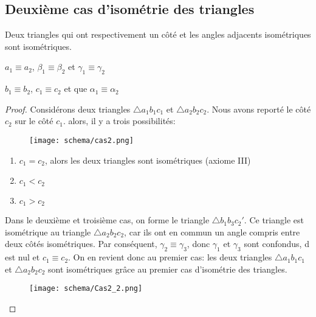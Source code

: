 \documentclass[a4paper,12pt]{article}
\begin{document}
\pagebreak
\subsection{Deuxième cas d'isométrie des triangles}
\begin{theorem}
Deux triangles qui ont respectivement un côté et les angles adjacents isométriques sont isométriques.
\end{theorem}
\begin{hyp}
$a_1 \equiv a_2$, $\beta_1 \equiv \beta_2$ et $\gamma_1 \equiv \gamma_2$
\end{hyp}
\begin{concl}
$b_1 \equiv b_2$, $c_1 \equiv c_2$ et que $\alpha_1 \equiv \alpha_2$
\end{concl}
\begin{proof}
Considérons deux triangles $\triangle a_1b_1c_1$ et $\triangle a_2b_2c_2$. Nous avons reporté le côté $c_2$ sur le côté $c_1$. alors, il y a trois possibilités:
\begin{figure}[H]
    \centering
    \texttt{[image: schema/cas2.png]}
\end{figure}
\begin{enumerate}
\item $c_1 = c_2$, alors les deux triangles sont isométriques (axiome III)
\item $c_1<c_2$
\item $c_1>c_2$
\end{enumerate}

\pagebreak
Dans le deuxième et troisième cas, on forme le triangle $\triangle b_1b_3c_2'$. Ce triangle est isométrique au triangle $\triangle a_2b_2c_2$, car ils ont en commun un angle compris entre deux côtés isométriques. Par conséquent, $\gamma_2\equiv \gamma_3$, donc $\gamma_1$ et $\gamma_3$ sont confondus, d est nul et $c_1\equiv c_2$. On en revient donc au premier cas: les deux triangles $\triangle a_1b_1c_1$ et $\triangle a_2b_2c_2$ sont isométriques grâce au premier cas d'isométrie des triangles.


\begin{figure}[H]
    \centering
    \texttt{[image: schema/Cas2\_2.png]}
\end{figure}



\end{proof}
\end{document}

